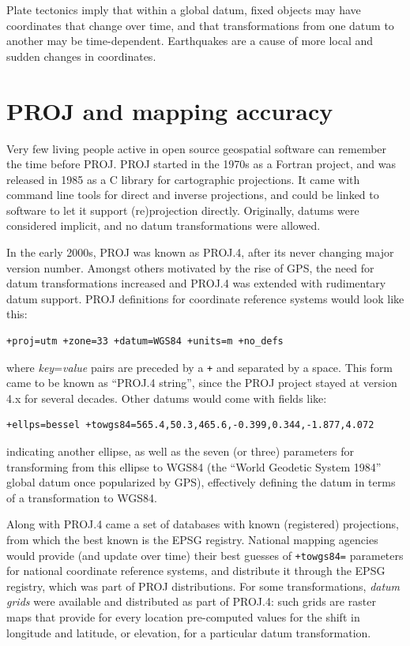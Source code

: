 \documentclass[]{book}
\begin{document}
Plate tectonics imply that within a global datum, fixed objects may
have coordinates that change over time, and that transformations
from one datum to another may be time-dependent. Earthquakes are a
cause of more local and sudden changes in coordinates.

\hypertarget{projlib}{%
\section{PROJ and mapping accuracy}\label{projlib}}

Very few living people active in open source geospatial software
can remember the time before PROJ. PROJ \citep{evenden:90} started in the
1970s as a Fortran project, and was released in 1985 as a C library
for cartographic projections. It came with command line tools for
direct and inverse projections, and could be linked to software
to let it support (re)projection directly. Originally, datums were
considered implicit, and no datum transformations were allowed.

In the early 2000s, PROJ was known as PROJ.4, after its never changing
major version number. Amongst others motivated by the rise of GPS,
the need for datum transformations increased and PROJ.4 was extended
with rudimentary datum support. PROJ definitions for coordinate
reference systems would look like this:

\begin{verbatim}
+proj=utm +zone=33 +datum=WGS84 +units=m +no_defs
\end{verbatim}

where \emph{key}=\emph{value} pairs are preceded by a \texttt{+} and separated by
a space. This form came to be known as ``PROJ.4 string'', since the
PROJ project stayed at version 4.x for several decades. Other datums
would come with fields like:

\begin{verbatim}
+ellps=bessel +towgs84=565.4,50.3,465.6,-0.399,0.344,-1.877,4.072
\end{verbatim}

indicating another ellipse, as well as the seven (or three)
parameters for transforming from this ellipse to WGS84 (the ``World
Geodetic System 1984'' global datum once popularized by GPS),
effectively defining the datum in terms of a transformation to WGS84.

Along with PROJ.4 came a set of databases with known (registered)
projections, from which the best known is the EPSG registry.
National mapping agencies would provide (and update over time)
their best guesses of \texttt{+towgs84=} parameters for national coordinate
reference systems, and distribute it through the EPSG registry,
which was part of PROJ distributions.
For some transformations, \emph{datum grids} were available and
distributed as part of PROJ.4: such grids are raster maps that provide
for every location pre-computed values for the shift in longitude
and latitude, or elevation, for a particular datum transformation.
\end{document}
